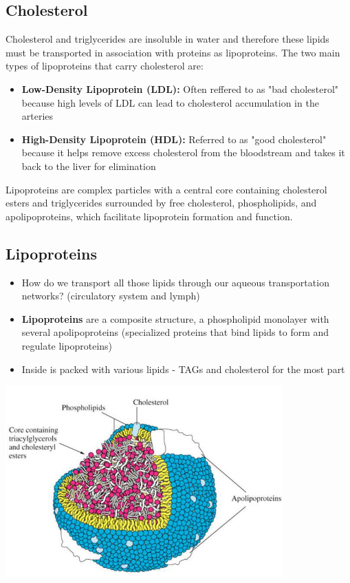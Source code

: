 \documentclass[10pt]{article}
\begin{document}
\subsection*{Cholesterol}
Cholesterol and triglycerides are insoluble in water and therefore these lipids must be transported in association with proteins as lipoproteins.  The two main types of lipoproteins that carry cholesterol are:
\begin{itemize}
    \item \textbf{Low-Density Lipoprotein (LDL):} Often reffered to as "bad cholesterol" because high levels of LDL can lead to cholesterol accumulation in the arteries
    \item \textbf{High-Density Lipoprotein (HDL):} Referred to as "good cholesterol" because it helps remove excess cholesterol from the bloodstream and takes it back to the liver for elimination
\end{itemize}
Lipoproteins are complex particles with a central core containing cholesterol esters and triglycerides surrounded by free cholesterol, phospholipids, and apolipoproteins, which facilitate lipoprotein formation and function.

\subsection*{Lipoproteins}
\begin{itemize}
    \item How do we transport all those lipids through our aqueous transportation networks?  (circulatory system and lymph)
    \item \textbf{Lipoproteins} are a composite structure, a phospholipid monolayer with several apolipoproteins (specialized proteins that bind lipids to form and regulate lipoproteins)
    \item Inside is packed with various lipids - TAGs and cholesterol for the most part
\end{itemize}
\begin{center}
    \includegraphics*[width=0.8\textwidth]{L2_18.png}
\end{center}
\end{document}
